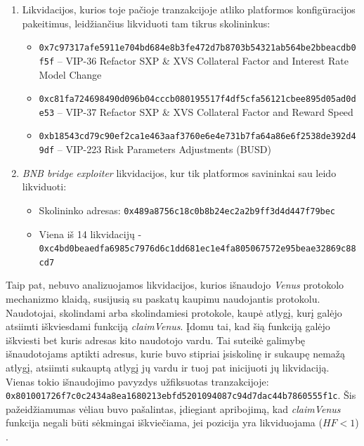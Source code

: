 \documentclass[]{VUMIFTemplateClass}
\begin{document}
\begin{enumerate}
    \item Likvidacijos, kurios toje pačioje tranzakcijoje atliko platformos konfigūracijos pakeitimus, leidžiančius likviduoti tam tikrus skolininkus:
    \begin{itemize}
        \item \texttt{0x7c97317afe5911e704bd684e8b3fe472d7b8703b54321ab564be2bbeacdb0f5f} – VIP-36 Refactor SXP \& XVS Collateral Factor and Interest Rate Model Change
        \item \texttt{0xc81fa724698490d096b04cccb080195517f4df5cfa56121cbee895d05ad0de53} – VIP-37 Refactor SXP \& XVS Collateral Factor and Reward Speed
        \item \texttt{0xb18543cd79c90ef2ca1e463aaf3760e6e4e731b7fa64a86e6f2538de392d49df} – VIP-223 Risk Parameters Adjustments (BUSD)
    \end{itemize}
    \item \textit{BNB bridge exploiter} likvidacijos, kur tik platformos savininkai sau leido likviduoti:
    \begin{itemize}
        \item Skolininko adresas: \texttt{0x489a8756c18c0b8b24ec2a2b9ff3d4d447f79bec}
        \item Viena iš 14 likvidacijų - \\\texttt{0xc4bd0beaedfa6985c7976d6c1dd681ec1e4fa805067572e95beae32869c88cd7}
    \end{itemize}
\end{enumerate}

Taip pat, nebuvo analizuojamos likvidacijos, kurios išnaudojo \textit{Venus} protokolo mechanizmo klaidą, susijusią su paskatų kaupimu naudojantis protokolu. Naudotojai, skolindami arba skolindamiesi protokole, kaupė atlygį, kurį galėjo atsiimti iškviesdami funkciją \textit{claimVenus}. Įdomu tai, kad šią funkciją galėjo iškviesti bet kuris adresas kito naudotojo vardu. Tai suteikė galimybę išnaudotojams aptikti adresus, kurie buvo stipriai įsiskolinę ir sukaupę nemažą atlygį, atsiimti sukauptą atlygį jų vardu ir tuoj pat inicijuoti jų likvidaciją. Vienas tokio išnaudojimo pavyzdys užfiksuotas tranzakcijoje: \texttt{0x801001726f7c0c2434a8ea1680213ebfd5201094087c94d7dac44b7860555f1c}. Šis pažeidžiamumas vėliau buvo pašalintas, įdiegiant apribojimą, kad \textit{claimVenus} funkcija negali būti sėkmingai iškviečiama, jei pozicija yra likviduojama ($HF < 1$) \cite{exploitFix}.

\end{document}

